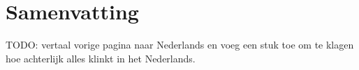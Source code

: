 
\chapter*{Samenvatting}
TODO: vertaal vorige pagina naar Nederlands en voeg een stuk toe om te klagen hoe achterlijk alles klinkt in het Nederlands.